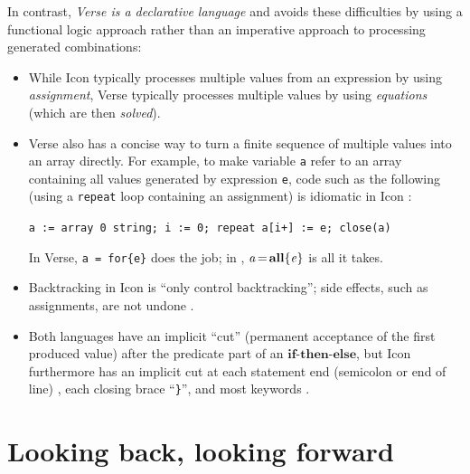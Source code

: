 \documentclass[acmsmall]{acmart}
\newcommand{\Varid}[1]{\mathit{#1}}
\begin{document}
In contrast, \emph{Verse is a declarative language} and
avoids these difficulties by using a functional logic approach
rather than an imperative approach to processing generated combinations:
\begin{itemize}
\item While Icon typically processes multiple values from an expression by using \emph{assignment},
  Verse typically processes multiple values by using \emph{equations}
  (which are then \emph{solved}).
\item
  Verse also has a concise way to turn a finite sequence of multiple
  values into an array directly.
  For example, to make variable \texttt{a} refer to an array containing all values generated by expression \texttt{e},
  code such as the following (using a \texttt{repeat} loop containing an assignment) is idiomatic in Icon \cite[\S 8]{griswold:icon-overview}:\\
\centerline{
  \texttt{a := array 0 string; i := 0; repeat a[i+] := e; close(a)}
  }
  In Verse,
  \texttt{a~=~for\{e\}} does the job; in \versecalc{}, \ensuremath{\Varid{a}\hspace{-0.14em}=\hspace{-0.14em}\textbf{all}\{\Varid{e}\}} is all it takes.
\item Backtracking in Icon is ``only control backtracking''; side effects, such as assignments, are not undone \cite[\S 3.1]{griswold:generators-in-icon}.
\item Both languages have an implicit ``cut'' (permanent acceptance of the first produced value) after the predicate part of an \ensuremath{\textbf{if}}-\ensuremath{\textbf{then}}-\ensuremath{\textbf{else}},
  but Icon furthermore has an implicit cut at each statement end (semicolon or end of line) \cite[\S 3.1]{griswold:generators-in-icon}, each
  closing brace ``\texttt{\}}'', and most keywords \cite{icon-programming-corner-4}.
\end{itemize}



\section{Looking back, looking forward}
\end{document}
